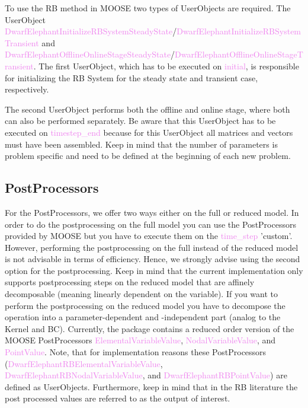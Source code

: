 \documentclass[11pt, a4paper, DIV=14]{scrartcl}
\begin{document}
To use the RB method in MOOSE two types of UserObjects are required.
The UserObject \textcolor{violet}{DwarfElephant\-Initialize\-RB\-System\-Steady\-State}/\textcolor{violet}{DwarfElephant\-Initialize\-RB\-System\-Transient} and \textcolor{violet}{Dwarf\-Elephant\-Offline\-Online\-Stage\-Steady\-State}/\textcolor{violet}{Dwarf\-Elephant\-Offline\-Online\-Stage\-Transient}. The first UserObject, which has to be executed on \textcolor{violet}{initial}, is responsible for initializing the RB System for the steady state and transient case, respectively. 

The second UserObject performs both the offline and online stage, where both can also be performed separately. Be aware that this UserObject has to be executed on \textcolor{violet}{timestep\_end} because for this UserObject all matrices and vectors must have been assembled. 
Keep in mind that the number of parameters is problem specific and need to be defined at the beginning of each new problem.

\subsection{PostProcessors}
For the PostProcessors, we offer two ways either on the full or reduced model. In order to do the postprocessing on the full model you can use the PostProcessors provided by MOOSE but you have to execute them on the \textcolor{violet}{time\_step} 'custom'. However, performing the postprocessing on the full instead of the reduced model is not advisable in terms of efficiency. Hence, we strongly advise using the second option for the postprocessing. Keep in mind that the current implementation only supports postprocessing steps on the reduced model that are affinely decomposable  (meaning linearly dependent on the variable). If you want to perform the postprocessing on the reduced model you have to decompose the operation into a parameter-dependent and -independent part (analog to the Kernel and BC). Currently, the package contains a reduced order version of the MOOSE PostProcessors  \textcolor{violet}{ElementalVariableValue},  \textcolor{violet}{NodalVariableValue}, and  \textcolor{violet}{PointValue}. Note, that for implementation reasons these PostProcessors (\textcolor{violet}{DwarfElephantRBElementalVariableValue},  \textcolor{violet}{DwarfElephantRBNodalVariableValue}, and  \textcolor{violet}{DwarfElephantRBPointValue}) are defined as UserObjects. Furthermore, keep in mind that in the RB literature the post processed values are referred to as the output of interest.
\end{document}

